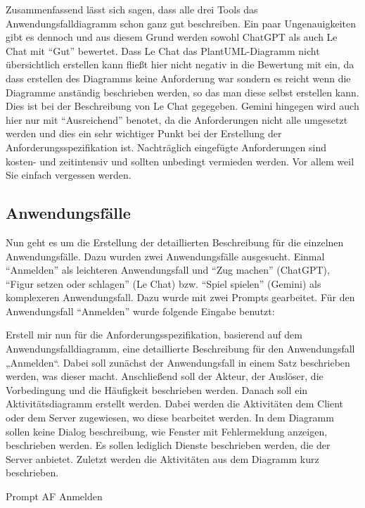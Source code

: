 Zusammenfassend lässt sich sagen, dass alle drei Tools das Anwendungsfalldiagramm schon ganz gut beschreiben. Ein paar Ungenauigkeiten gibt es dennoch und aus 
diesem Grund werden sowohl ChatGPT als auch Le Chat mit ``Gut'' bewertet. Dass Le Chat das PlantUML-Diagramm nicht übersichtlich erstellen kann fließt hier nicht
negativ in die Bewertung mit ein, da dass erstellen des Diagramms keine Anforderung war sondern es reicht wenn die Diagramme anständig beschrieben werden, so das man 
diese selbst erstellen kann. Dies ist bei der Beschreibung von Le Chat gegegeben. Gemini hingegen wird auch hier nur mit ``Ausreichend'' benotet, da die Anforderungen 
nicht alle umgesetzt werden und dies ein sehr wichtiger Punkt bei der Erstellung der Anforderungsspezifikation ist. Nachträglich eingefügte Anforderungen sind kosten- 
und zeitintensiv und sollten unbedingt vermieden werden. Vor allem weil Sie einfach vergessen werden. 

\subsection*{Anwendungsfälle}

Nun geht es um die Erstellung der detaillierten Beschreibung für die einzelnen Anwendungsfälle. Dazu wurden zwei Anwendungsfälle ausgesucht.
Einmal ``Anmelden'' als leichteren Anwendungsfall und ``Zug machen'' (ChatGPT), ``Figur setzen oder schlagen'' (Le Chat) bzw. ``Spiel spielen'' (Gemini)
als komplexeren Anwendungsfall. Dazu wurde mit zwei Prompts gearbeitet. Für den Anwendungsfall ``Anmelden'' wurde folgende Eingabe benutzt:

\begin{prompt}[H]
    \begin{tcolorbox}[colback=gray!20, colframe=gray!20, boxrule=0pt, sharp corners] 
        Erstell mir nun für die Anforderungsspezifikation, basierend auf dem Anwendungsfalldiagramm, eine detaillierte Beschreibung für den Anwendungsfall „Anmelden“. Dabei 
        soll zunächst der Anwendungsfall in einem Satz beschrieben werden, was dieser macht. Anschließend soll der Akteur, der Auslöser, die Vorbedingung und die Häufigkeit 
        beschrieben werden. Danach soll ein Aktivitätsdiagramm erstellt werden. Dabei werden die Aktivitäten dem Client oder dem Server zugewiesen, wo diese bearbeitet werden. 
        In dem Diagramm sollen keine Dialog beschreibung, wie Fenster mit Fehlermeldung anzeigen, beschrieben werden. Es sollen lediglich Dienste beschrieben werden, die der 
        Server anbietet. Zuletzt werden die Aktivitäten aus dem Diagramm kurz beschrieben.
        \vfill
    \end{tcolorbox}
    \caption{Prompt AF Anmelden}
    \label{Prompt AF Anmelden}
\end{prompt}

